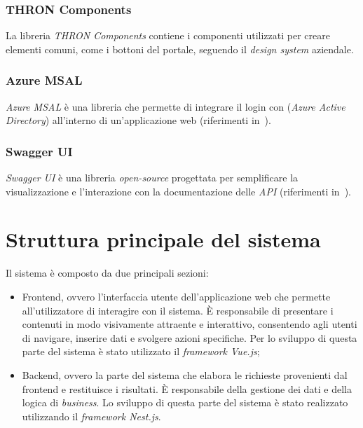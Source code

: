 \subsubsection{THRON Components}\label{subsubsec:thron-components}
La libreria \textit{THRON Components} contiene i componenti utilizzati per creare elementi comuni, come i bottoni del portale, seguendo il \textit{design system} aziendale.
\subsubsection{Azure MSAL}\label{subsubsec:azure-MSAL}
\textit{Azure MSAL} è una libreria che permette di integrare il login con  (\textit{Azure Active Directory}) all'interno di un'applicazione web (riferimenti in~\cite{site:msal}).
\subsubsection{Swagger UI}\label{subsubsec:swagger-ui}
\textit{Swagger UI} è una libreria \textit{open-source} progettata per semplificare la visualizzazione e l'interazione con la documentazione delle \textit{API} (riferimenti in~\cite{site:swagger}).

\section{Struttura principale del sistema}\label{sec:struttura-principale-sistema}
Il sistema è composto da due principali sezioni:
\begin{itemize}
  \item Frontend, ovvero l'interfaccia utente dell'applicazione web che permette all'utilizzatore di interagire con il sistema. È responsabile di presentare i contenuti in modo visivamente attraente e interattivo, consentendo agli utenti di navigare, inserire dati e svolgere azioni specifiche. Per lo
  sviluppo di questa parte del sistema è stato utilizzato il \textit{framework Vue.js};
  \item Backend, ovvero la parte del sistema che elabora le richieste provenienti dal frontend e restituisce i risultati. È responsabile della gestione dei dati e della logica di \textit{business}.
  Lo sviluppo di questa parte del sistema è stato realizzato utilizzando il \textit{framework Nest.js}. 
\end{itemize}

